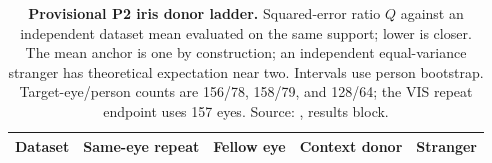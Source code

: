 \begin{table}[!htbp]
\centering
\caption{\textbf{Provisional P2 iris donor ladder.} Squared-error ratio $Q$ against an independent dataset mean evaluated on the same support; lower is closer.
The mean anchor is one by construction; an independent equal-variance stranger has theoretical expectation near two.
Intervals use person bootstrap.
Target-eye/person counts are 156/78, 158/79, and 128/64; the VIS repeat endpoint uses 157 eyes.
Source: , results block.}
\label{tab:iris}
\small
\begin{tabular}{@{}lcccc@{}}
\toprule
Dataset & Same-eye repeat & Fellow eye & Context donor & Stranger \\
\midrule

\end{tabular}
\end{table}
